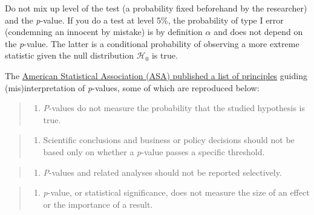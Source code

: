 \documentclass[
  11pt,
  letterpaper,
]{scrbook}
\providecommand{\tightlist}{%
  \setlength{\itemsep}{0pt}\setlength{\parskip}{0pt}}\usepackage{longtable,booktabs,array}
\theoremstyle{definition}
\theoremstyle{definition}
\theoremstyle{remark}
\begin{document}
Do not mix up level of the test (a probability fixed beforehand by the
researcher) and the \emph{p}-value. If you do a test at level 5\%, the
probability of type I error (condemning an innocent by mistake) is by
definition \(\alpha\) and does not depend on the \emph{p}-value. The
latter is a conditional probability of observing a more extreme
statistic given the null distribution \(\mathscr{H}_0\) is true.

\begin{tcolorbox}[enhanced jigsaw, bottomrule=.15mm, coltitle=black, colframe=quarto-callout-caution-color-frame, left=2mm, opacityback=0, breakable, opacitybacktitle=0.6, rightrule=.15mm, toprule=.15mm, title=\textcolor{quarto-callout-caution-color}{\faFire}\hspace{0.5em}{Pitfall}, toptitle=1mm, leftrule=.75mm, titlerule=0mm, colback=white, arc=.35mm, bottomtitle=1mm, colbacktitle=quarto-callout-caution-color!10!white]

The \href{https://doi.org/10.1080/00031305.2016.1154108}{American
Statistical Association (ASA) published a list of principles} guiding
(mis)interpretation of \emph{p}-values, some of which are reproduced
below:

\begin{quote}
\begin{enumerate}
\def\labelenumi{(\arabic{enumi})}
\setcounter{enumi}{1}
\tightlist
\item
  \emph{P}-values do not measure the probability that the studied
  hypothesis is true.
\end{enumerate}
\end{quote}

\begin{quote}
\begin{enumerate}
\def\labelenumi{(\arabic{enumi})}
\setcounter{enumi}{2}
\tightlist
\item
  Scientific conclusions and business or policy decisions should not be
  based only on whether a \emph{p}-value passes a specific threshold.
\end{enumerate}
\end{quote}

\begin{quote}
\begin{enumerate}
\def\labelenumi{(\arabic{enumi})}
\setcounter{enumi}{3}
\tightlist
\item
  \emph{P}-values and related analyses should not be reported
  selectively.
\end{enumerate}
\end{quote}

\begin{quote}
\begin{enumerate}
\def\labelenumi{(\arabic{enumi})}
\setcounter{enumi}{4}
\tightlist
\item
  \emph{p}-value, or statistical significance, does not measure the size
  of an effect or the importance of a result.
\end{enumerate}
\end{quote}

\end{tcolorbox}
\end{document}

